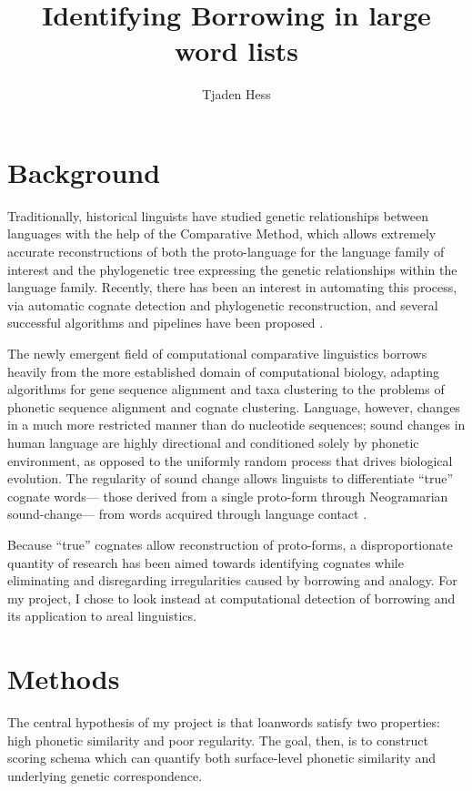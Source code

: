 \documentclass[doc,natbib,12pt]{apa6}
\title{Identifying Borrowing in large word lists}
\author{Tjaden Hess}
\affiliation{Cornell University}
\begin{document}
\maketitle
\doublespacing
\section{ Background }
Traditionally, historical linguists have studied genetic relationships between languages with the help of the Comparative Method, which allows extremely accurate reconstructions of both the proto-language for the language family of interest and the phylogenetic tree expressing the genetic relationships within the language family. Recently, there has been an interest in automating this process, via automatic cognate detection and phylogenetic reconstruction, and several successful algorithms and pipelines have been proposed \citep{List2017a}.

The newly emergent field of computational comparative linguistics borrows heavily from the more established domain of computational biology, adapting algorithms for gene sequence alignment and taxa clustering to the problems of phonetic sequence alignment and cognate clustering. Language, however, changes in a much more restricted manner than do nucleotide sequences; sound changes in human language are highly directional and conditioned solely by phonetic environment, as opposed to the uniformly random process that drives biological evolution. The regularity of sound change allows linguists to differentiate ``true'' cognate words--- those derived from a single proto-form through Neogramarian sound-change--- from words acquired through language contact \citep[p. 108]{Campbell1999}.

Because ``true'' cognates allow reconstruction of proto-forms, a disproportionate quantity of research has been aimed towards identifying cognates while eliminating and disregarding irregularities caused by borrowing and analogy. For my project, I chose to look instead at computational detection of borrowing and its application to areal linguistics.

\section{Methods}

The central hypothesis of my project is that loanwords satisfy two properties: high phonetic similarity and poor regularity. The goal, then, is to construct scoring schema which can quantify both surface-level phonetic similarity and underlying genetic correspondence.
\end{document}

